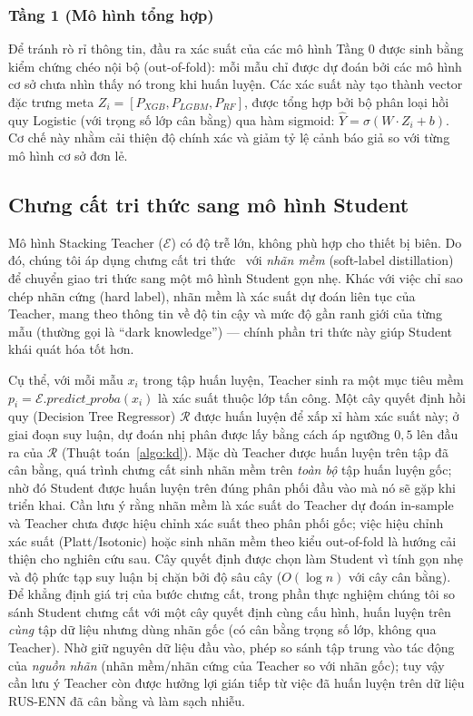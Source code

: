 \subsubsection{Tầng 1 (Mô hình tổng hợp)} Để tránh rò rỉ thông tin, đầu ra xác suất của các mô hình Tầng 0 được sinh bằng kiểm chứng chéo nội bộ (out-of-fold): mỗi mẫu chỉ được dự đoán bởi các mô hình cơ sở chưa nhìn thấy nó trong khi huấn luyện. Các xác suất này tạo thành vector đặc trưng meta $Z_i = [P_{XGB}, P_{LGBM}, P_{RF}]$, được tổng hợp bởi bộ phân loại hồi quy Logistic (với trọng số lớp cân bằng) qua hàm sigmoid: $\hat{Y} = \sigma(W \cdot Z_i + b)$. Cơ chế này nhằm cải thiện độ chính xác và giảm tỷ lệ cảnh báo giả so với từng mô hình cơ sở đơn lẻ.

\subsection{Chưng cất tri thức sang mô hình Student}
Mô hình Stacking Teacher ($\mathcal{E}$) có độ trễ lớn, không phù hợp cho thiết bị biên. Do đó, chúng tôi áp dụng chưng cất tri thức~\cite{hinton2015distilling} với \emph{nhãn mềm} (soft-label distillation) để chuyển giao tri thức sang một mô hình Student gọn nhẹ. Khác với việc chỉ sao chép nhãn cứng (hard label), nhãn mềm là xác suất dự đoán liên tục của Teacher, mang theo thông tin về độ tin cậy và mức độ gần ranh giới của từng mẫu (thường gọi là ``dark knowledge'') --- chính phần tri thức này giúp Student khái quát hóa tốt hơn.

Cụ thể, với mỗi mẫu $x_i$ trong tập huấn luyện, Teacher sinh ra một mục tiêu mềm $p_i = \mathcal{E}.predict\_proba(x_i)$ là xác suất thuộc lớp tấn công. Một cây quyết định hồi quy (Decision Tree Regressor) $\mathcal{R}$ được huấn luyện để xấp xỉ hàm xác suất này; ở giai đoạn suy luận, dự đoán nhị phân được lấy bằng cách áp ngưỡng $0,5$ lên đầu ra của $\mathcal{R}$ (Thuật toán~\ref{algo:kd}). Mặc dù Teacher được huấn luyện trên tập đã cân bằng, quá trình chưng cất sinh nhãn mềm trên \emph{toàn bộ} tập huấn luyện gốc; nhờ đó Student được huấn luyện trên đúng phân phối đầu vào mà nó sẽ gặp khi triển khai. Cần lưu ý rằng nhãn mềm là xác suất do Teacher dự đoán in-sample và Teacher chưa được hiệu chỉnh xác suất theo phân phối gốc; việc hiệu chỉnh xác suất (Platt/Isotonic) hoặc sinh nhãn mềm theo kiểu out-of-fold là hướng cải thiện cho nghiên cứu sau. Cây quyết định được chọn làm Student vì tính gọn nhẹ và độ phức tạp suy luận bị chặn bởi độ sâu cây ($O(\log n)$ với cây cân bằng). Để khẳng định giá trị của bước chưng cất, trong phần thực nghiệm chúng tôi so sánh Student chưng cất với một cây quyết định cùng cấu hình, huấn luyện trên \emph{cùng} tập dữ liệu nhưng dùng nhãn gốc (có cân bằng trọng số lớp, không qua Teacher). Nhờ giữ nguyên dữ liệu đầu vào, phép so sánh tập trung vào tác động của \emph{nguồn nhãn} (nhãn mềm/nhãn cứng của Teacher so với nhãn gốc); tuy vậy cần lưu ý Teacher còn được hưởng lợi gián tiếp từ việc đã huấn luyện trên dữ liệu RUS-ENN đã cân bằng và làm sạch nhiễu.

